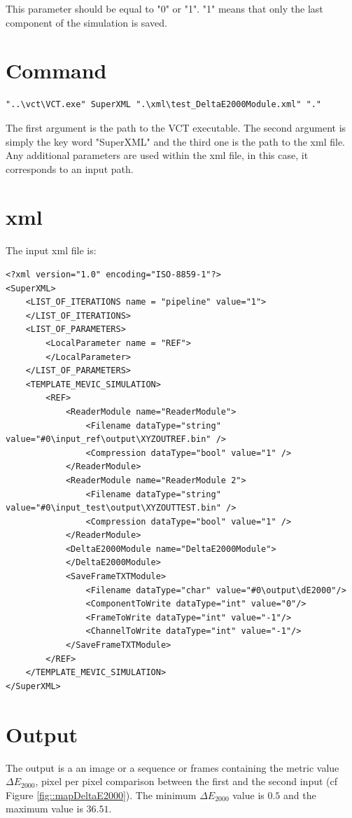 This parameter should be equal to "0" or "1". "1" means that only the last component of the simulation is saved.

\section{Command}

\lstset{language=C++}
\begin{lstlisting}
"..\vct\VCT.exe" SuperXML ".\xml\test_DeltaE2000Module.xml" "."
\end{lstlisting}

The first argument is the path to the VCT executable. The second argument is simply the key word "SuperXML" and the third one is the path to the xml file. Any additional parameters are used within the xml file, in this case, it corresponds to an input path.

\section{xml}

The input xml file is:

\lstset{language=XML}
\begin{lstlisting}
<?xml version="1.0" encoding="ISO-8859-1"?>
<SuperXML>
	<LIST_OF_ITERATIONS name = "pipeline" value="1">	
	</LIST_OF_ITERATIONS>
	<LIST_OF_PARAMETERS>
		<LocalParameter name = "REF">
		</LocalParameter>				
	</LIST_OF_PARAMETERS>
	<TEMPLATE_MEVIC_SIMULATION>
		<REF>
			<ReaderModule name="ReaderModule">
				<Filename dataType="string" value="#0\input_ref\output\XYZOUTREF.bin" />
				<Compression dataType="bool" value="1" />
			</ReaderModule>
			<ReaderModule name="ReaderModule 2">
				<Filename dataType="string" value="#0\input_test\output\XYZOUTTEST.bin" />
				<Compression dataType="bool" value="1" />
			</ReaderModule>	
			<DeltaE2000Module name="DeltaE2000Module">
			</DeltaE2000Module>	
			<SaveFrameTXTModule>
				<Filename dataType="char" value="#0\output\dE2000"/>
				<ComponentToWrite dataType="int" value="0"/>
				<FrameToWrite dataType="int" value="-1"/>
				<ChannelToWrite dataType="int" value="-1"/>
			</SaveFrameTXTModule>			
		</REF>	
	</TEMPLATE_MEVIC_SIMULATION>
</SuperXML>
\end{lstlisting}

\section{Output}

The output is a an image or a sequence or frames containing the metric value $\Delta{E_{2000}}$, pixel per pixel comparison between the first and the second input (cf Figure \ref{fig::mapDeltaE2000}). The minimum $\Delta{E_{2000}}$ value is $0.5$ and the maximum value is $36.51$.

